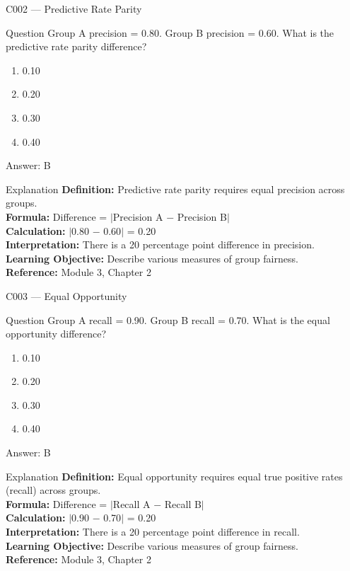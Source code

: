 \documentclass[aspectratio=169,8pt]{beamer}
\begin{document}
	\begin{frame}{C002 --- Predictive Rate Parity}
		\begin{block}{Question}
			Group A precision = 0.80. Group B precision = 0.60. What is the predictive rate parity difference?
			\begin{enumerate}
				\item 0.10
				\item 0.20
				\item 0.30
				\item 0.40
			\end{enumerate}
		\end{block}
		\begin{exampleblock}{Answer: B}\end{exampleblock}
		\begin{block}{Explanation}
			\textbf{Definition:} Predictive rate parity requires equal precision across groups.\\
			\textbf{Formula:} Difference = $|$Precision A $-$ Precision B$|$\\
			\textbf{Calculation:} $|$0.80 $-$ 0.60$|$ = 0.20\\
			\textbf{Interpretation:} There is a 20 percentage point difference in precision.\\
			\textbf{Learning Objective:} Describe various measures of group fairness.\\
			\textbf{Reference:} Module 3, Chapter 2
		\end{block}
	\end{frame}
	
	\begin{frame}{C003 --- Equal Opportunity}
		\begin{block}{Question}
			Group A recall = 0.90. Group B recall = 0.70. What is the equal opportunity difference?
			\begin{enumerate}
				\item 0.10
				\item 0.20
				\item 0.30
				\item 0.40
			\end{enumerate}
		\end{block}
		\begin{exampleblock}{Answer: B}\end{exampleblock}
		\begin{block}{Explanation}
			\textbf{Definition:} Equal opportunity requires equal true positive rates (recall) across groups.\\
			\textbf{Formula:} Difference = $|$Recall A $-$ Recall B$|$\\
			\textbf{Calculation:} $|$0.90 $-$ 0.70$|$ = 0.20\\
			\textbf{Interpretation:} There is a 20 percentage point difference in recall.\\
			\textbf{Learning Objective:} Describe various measures of group fairness.\\
			\textbf{Reference:} Module 3, Chapter 2
		\end{block}
	\end{frame}
	
\end{document}
